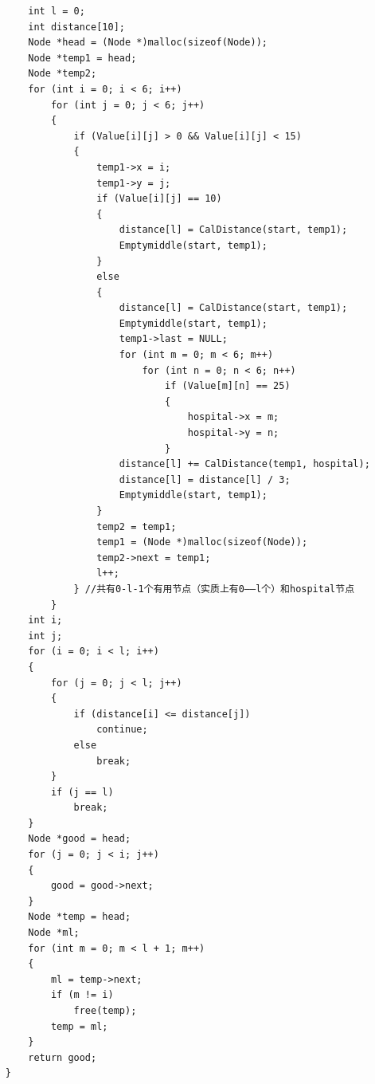 \documentclass[UTF8]{ctexart}
\begin{document}
\begin{lstlisting}
        int l = 0;
        int distance[10];
        Node *head = (Node *)malloc(sizeof(Node));
        Node *temp1 = head;
        Node *temp2;
        for (int i = 0; i < 6; i++)
            for (int j = 0; j < 6; j++)
            {
                if (Value[i][j] > 0 && Value[i][j] < 15)
                {
                    temp1->x = i;
                    temp1->y = j;
                    if (Value[i][j] == 10)
                    {
                        distance[l] = CalDistance(start, temp1);
                        Emptymiddle(start, temp1);
                    }
                    else
                    {
                        distance[l] = CalDistance(start, temp1);
                        Emptymiddle(start, temp1);
                        temp1->last = NULL;
                        for (int m = 0; m < 6; m++)
                            for (int n = 0; n < 6; n++)
                                if (Value[m][n] == 25)
                                {
                                    hospital->x = m;
                                    hospital->y = n;
                                }
                        distance[l] += CalDistance(temp1, hospital);
                        distance[l] = distance[l] / 3;
                        Emptymiddle(start, temp1);
                    }
                    temp2 = temp1;
                    temp1 = (Node *)malloc(sizeof(Node));
                    temp2->next = temp1;
                    l++;
                } //共有0-l-1个有用节点（实质上有0——l个）和hospital节点
            }
        int i;
        int j;
        for (i = 0; i < l; i++)
        {
            for (j = 0; j < l; j++)
            {
                if (distance[i] <= distance[j])
                    continue;
                else
                    break;
            }
            if (j == l)
                break;
        }
        Node *good = head;
        for (j = 0; j < i; j++)
        {
            good = good->next;
        }
        Node *temp = head;
        Node *ml;
        for (int m = 0; m < l + 1; m++)
        {
            ml = temp->next;
            if (m != i)
                free(temp);
            temp = ml;
        }
        return good;
    }
    

\end{lstlisting}
\end{document}
